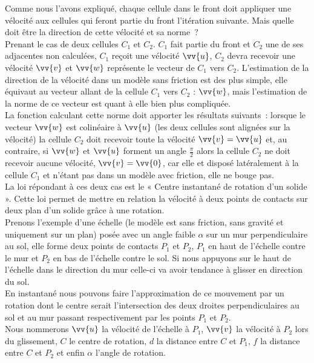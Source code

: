\documentclass[a4paper,11pt]{article}
\begin{document}
Comme nous l'avons expliqué, chaque cellule dans le front doit appliquer une vélocité aux cellules qui feront partie du front l'itération suivante.
Mais quelle doit être la direction de cette vélocité et sa norme~?\\
Prenant le cas de deux cellules $C_1$ et $C_2$.
$C_1$ fait partie du front et $C_2$ une de ses adjacentes non calculées, $C_1$ reçoit une vélocité $\vv{u}$, $C_2$ devra recevoir une vélocité $\vv{v}$ et $\vv{w}$ représente le vecteur de $C_1$ vers $C_2$.
L'estimation de la direction de la vélocité dans un modèle sans friction est des plus simple, elle équivaut au vecteur allant de la cellule $C_1$ vers $C_2$ : $\vv{w}$, mais l'estimation de la norme de ce vecteur est quant à elle bien plus compliquée.\\
La fonction calculant cette norme doit apporter les résultats suivants~:
lorsque le vecteur $\vv{w}$ est colinéaire à $\vv{u}$ (les deux cellules sont alignées sur la vélocité) la cellule $C_2$ doit recevoir toute la vélocité $\vv{v} = \vv{u}$ et, au contraire, si $\vv{w}$ et $\vv{u}$ forment un angle $\frac{\pi}{2}$ alors la cellule $C_2$ ne doit recevoir aucune vélocité, $\vv{v} = \vv{0}$, car elle et disposé latéralement à la cellule $C_1$ et n'étant pas dans un modèle avec friction, elle ne bouge pas.\\
La loi répondant à ces deux cas est le « Centre instantané de rotation d'un solide ».
Cette loi permet de mettre en relation la vélocité à deux points de contacts sur deux plan d'un solide grâce à une rotation.\\
Prenons l'exemple d'une échelle (le modèle est sans friction, sans gravité et uniquement sur un plan) posée avec un angle faible $\alpha$ sur un mur perpendiculaire au sol, elle forme deux points de contacts $P_1$ et $P_2$, $P_1$ en haut de l'échelle contre le mur et $P_2$ en bas de l'échelle contre le sol.
Si nous appuyons sur le haut de l'échelle dans le direction du mur celle-ci va avoir tendance à glisser en direction du sol.\\
En instantané nous pouvons faire l'approximation de ce mouvement par un rotation dont le centre serait l'intersection des deux droites perpendiculaires au sol et au mur passant respectivement par les points $P_1$ et $P_2$.\\
Nous nommerons $\vv{u}$ la vélocité de l'échelle à $P_1$, $\vv{v}$ la vélocité à $P_2$ lors du glissement, $C$ le centre de rotation, $d$ la distance entre $C$ et $P_1$, $f$ la distance entre $C$ et $P_2$ et enfin $\alpha$ l'angle de rotation.
\end{document}
